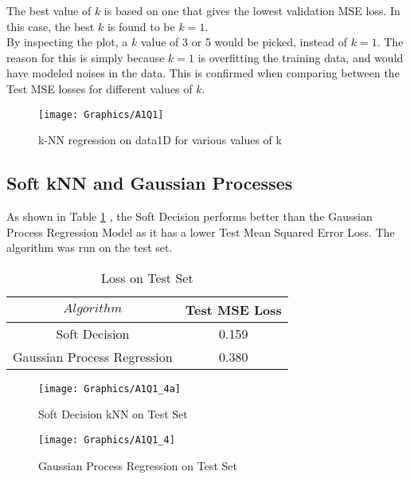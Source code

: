 \documentclass[a4paper,12pt]{article}
\begin{document}
The best value of $k$ is based on one that gives the lowest validation MSE loss. In this case, the best $k$ is found to be $k = 1$. \\

By inspecting the plot, a $k$ value of 3 or 5 would be picked, instead of $k = 1$. The reason for this is simply because $k = 1$ is overfitting the training data, and would have modeled noises in the data. This is confirmed when comparing between the Test MSE losses for different values of $k$.

\begin{figure}[!htb]
	\centering
	\texttt{[image: Graphics/A1Q1]}
    \caption{\label{figure:kNN} k-NN regression on data1D for various values of k}
\end{figure}

\clearpage

\subsection{Soft kNN and Gaussian Processes}

As shown in Table \ref{table:KLossTest} , the Soft Decision performs better than the Gaussian Process Regression Model as it has a lower Test Mean Squared Error Loss. The algorithm was run on the test set.

\begin{table}[ht]
\centering %
\caption{Loss on Test Set} %
\label{table:KLossTest} %
\begin{tabular}{c c} %
\hline %
$Algorithm$ & Test MSE Loss \\ [0.5ex] 
\hline
Soft Decision & 0.159  \\
Gaussian Process Regression & 0.380 \\ [1ex] %
\hline %
\end{tabular}
\end{table}

\begin{figure}[!htb]
	\centering
	\texttt{[image: Graphics/A1Q1\_4a]}
    \caption{\label{figure:abc} Soft Decision kNN on Test Set}
\end{figure}

\begin{figure}[!htb]
	\centering
	\texttt{[image: Graphics/A1Q1\_4]}
    \caption{\label{figure:abc} Gaussian Process Regression on Test Set}
\end{figure}
\end{document}
